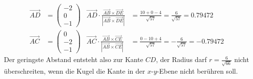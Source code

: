\begin{loesung}
\begin{align*}
\overrightarrow{AD}
&=
\begin{pmatrix}-2\\0\\-1\end{pmatrix}
&
\overrightarrow{AD}
\cdot
\frac{ \overrightarrow{AB}\times\overrightarrow{DE}}{|\overrightarrow{AB}\times\overrightarrow{DE}|}
&=
\frac{10+0-4}{\sqrt{57}}=\frac{6}{\sqrt{57}}=0.79472
\\
\overrightarrow{AC}
&=
\begin{pmatrix}0\\-2\\-1\end{pmatrix}
&
\overrightarrow{AC}
\cdot
\frac{ \overrightarrow{AB}\times\overrightarrow{CE}}{|\overrightarrow{AB}\times\overrightarrow{CE}|}
&=
\frac{0-10+4}{\sqrt{57}}=-\frac{6}{\sqrt{57}}=-0.79472
\end{align*}
Der geringste Abstand entsteht also zur Kante $CD$, der Radius darf
$r=\frac6{\sqrt{66}}$ nicht überschreiten, wenn die Kugel die Kante
in der $x$-$y$-Ebene nicht berühren soll.
\end{loesung}

